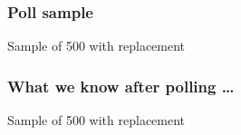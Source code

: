 \documentclass[handout]{beamer}
\begin{document}


   \begin{frame}
   \frametitle{Poll sample}
   \begin{center}
   \end{center}
   Sample of 500 with replacement
   \end{frame}



   \begin{frame}
   \frametitle{What we know after polling \dots}
   \begin{center}
   \end{center}
   Sample of 500 with replacement
   \end{frame}
\end{document}

